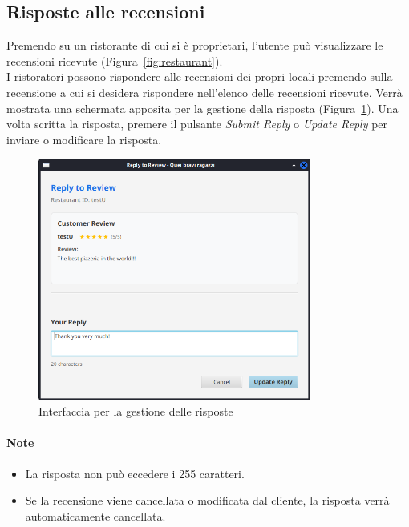 \subsection{Risposte alle recensioni}
Premendo su un ristorante di cui si è proprietari, l'utente può 
visualizzare le recensioni ricevute (Figura~\ref{fig:restaurant}).\\
I ristoratori possono rispondere alle recensioni dei propri locali premendo 
sulla recensione a cui si desidera rispondere nell'elenco delle recensioni ricevute.
Verrà mostrata una schermata apposita per la gestione della risposta (Figura~\ref{fig:reply}).
Una volta scritta la risposta, premere il pulsante \emph{Submit Reply} o 
\emph{Update Reply} per inviare o modificare la risposta.
\begin{figure}[H]
    \centering
    \includegraphics[width=0.8\textwidth]{images/reply.png}
    \caption{Interfaccia per la gestione delle risposte}
    \label{fig:reply}
\end{figure}
\paragraph{Note}
\begin{itemize}
    \item La risposta non può eccedere i 255 caratteri.
    \item Se la recensione viene cancellata o modificata dal cliente,
    la risposta verrà automaticamente cancellata.
\end{itemize}
